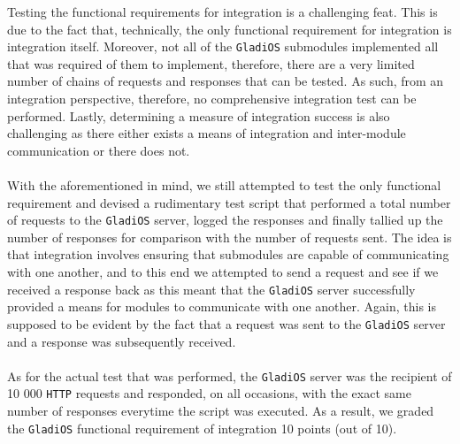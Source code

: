 \documentclass[12pt,a4paper,titlepage]{article}
\begin{document}
Testing the functional requirements for integration is a challenging feat. This
is due to the fact that, technically, the only functional requirement for
integration is integration itself. Moreover, not all of the \texttt{GladiOS} submodules
implemented all that was required of them to implement, therefore, there are a
very limited number of chains of requests and responses that can be tested. As
such, from an integration perspective, therefore, no comprehensive integration
test can be performed. Lastly, determining a measure of integration success is
also challenging as there either exists a means of integration and inter-module
communication or there does not.
\\\\
With the aforementioned in mind, we still attempted to test the only functional
requirement and devised a rudimentary test script that performed a total number
of requests to the \texttt{GladiOS} server, logged the responses and finally tallied up
the number of responses for comparison with the number of requests sent. The
idea is that integration involves ensuring that submodules are capable of
communicating with one another, and to this end we attempted to send a request
and see if we received a response back as this meant that the \texttt{GladiOS} server
successfully provided a means for modules to communicate with one another.
Again, this is supposed to be evident by the fact that a request was sent to
the \texttt{GladiOS} server and a response was subsequently received.
\\\\
As for the actual test that was performed, the \texttt{GladiOS} server was the recipient
of 10 000 \texttt{HTTP} requests and responded, on all occasions, with the exact same
number of responses everytime the script was executed. As a result, we graded
the \texttt{GladiOS} functional requirement of integration 10 points (out of 10).
\end{document}
